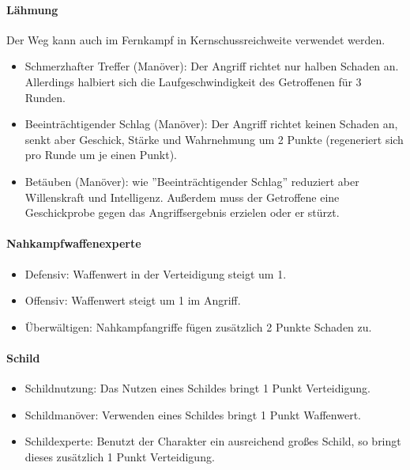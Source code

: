 \documentclass{article}
\begin{document}
\paragraph{Lähmung }

Der Weg kann auch im Fernkampf in Kernschussreichweite verwendet werden.

\begin{itemize}
\item Schmerzhafter Treffer (Manöver): Der Angriff richtet nur halben Schaden an. Allerdings halbiert sich die Laufgeschwindigkeit des Getroffenen für 3 Runden.
\item Beeinträchtigender Schlag (Manöver): Der Angriff richtet keinen Schaden an, senkt aber Geschick, Stärke und Wahrnehmung um 2 Punkte (regeneriert sich pro Runde um je einen Punkt).
\item Betäuben (Manöver): wie ''Beeinträchtigender Schlag'' reduziert aber Willenskraft und Intelligenz. Außerdem muss der Getroffene eine Geschickprobe gegen das Angriffsergebnis erzielen oder er stürzt.
\end{itemize}

\paragraph{Nahkampfwaffenexperte}

\begin{itemize}
\item Defensiv: Waffenwert in der Verteidigung steigt um 1.
\item Offensiv: Waffenwert steigt um 1 im Angriff.
\item Überwältigen: Nahkampfangriffe fügen zusätzlich 2 Punkte Schaden zu.
\end{itemize}

\paragraph{Schild}

\begin{itemize}
\item Schildnutzung: Das Nutzen eines Schildes bringt 1 Punkt Verteidigung.
\item Schildmanöver: Verwenden eines Schildes bringt 1 Punkt Waffenwert.
\item Schildexperte: Benutzt der Charakter ein ausreichend großes Schild, so bringt dieses zusätzlich 1 Punkt Verteidigung.
\end{itemize}
\end{document}
